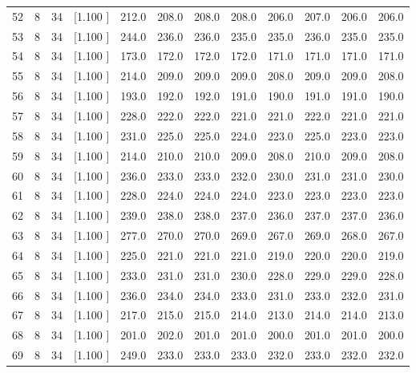 \documentclass[12pt,a4paper]{article}
\begin{document}
\begin{center}
{\begin{tabular}{r r r r r r r r r r r r}
  52&  8& 34&[1.100     ]&   212.0&   208.0&   208.0&   208.0&   206.0&   207.0&   206.0&   206.0\\[-0.02in]
  53&  8& 34&[1.100     ]&   244.0&   236.0&   236.0&   235.0&   235.0&   236.0&   235.0&   235.0\\[-0.02in]
  54&  8& 34&[1.100     ]&   173.0&   172.0&   172.0&   172.0&   171.0&   171.0&   171.0&   171.0\\[-0.02in]
  55&  8& 34&[1.100     ]&   214.0&   209.0&   209.0&   209.0&   208.0&   209.0&   209.0&   208.0\\[-0.02in]
  56&  8& 34&[1.100     ]&   193.0&   192.0&   192.0&   191.0&   190.0&   191.0&   191.0&   190.0\\[-0.02in]
  57&  8& 34&[1.100     ]&   228.0&   222.0&   222.0&   221.0&   221.0&   222.0&   221.0&   221.0\\[-0.02in]
  58&  8& 34&[1.100     ]&   231.0&   225.0&   225.0&   224.0&   223.0&   225.0&   223.0&   223.0\\[-0.02in]
  59&  8& 34&[1.100     ]&   214.0&   210.0&   210.0&   209.0&   208.0&   210.0&   209.0&   208.0\\[-0.02in]
  60&  8& 34&[1.100     ]&   236.0&   233.0&   233.0&   232.0&   230.0&   231.0&   231.0&   230.0\\[-0.02in]
  61&  8& 34&[1.100     ]&   228.0&   224.0&   224.0&   224.0&   223.0&   223.0&   223.0&   223.0\\[-0.02in]
  62&  8& 34&[1.100     ]&   239.0&   238.0&   238.0&   237.0&   236.0&   237.0&   237.0&   236.0\\[-0.02in]
  63&  8& 34&[1.100     ]&   277.0&   270.0&   270.0&   269.0&   267.0&   269.0&   268.0&   267.0\\[-0.02in]
  64&  8& 34&[1.100     ]&   225.0&   221.0&   221.0&   221.0&   219.0&   220.0&   220.0&   219.0\\[-0.02in]
  65&  8& 34&[1.100     ]&   233.0&   231.0&   231.0&   230.0&   228.0&   229.0&   229.0&   228.0\\[-0.02in]
  66&  8& 34&[1.100     ]&   236.0&   234.0&   234.0&   233.0&   231.0&   233.0&   232.0&   231.0\\[-0.02in]
  67&  8& 34&[1.100     ]&   217.0&   215.0&   215.0&   214.0&   213.0&   214.0&   214.0&   213.0\\[-0.02in]
  68&  8& 34&[1.100     ]&   201.0&   202.0&   201.0&   201.0&   200.0&   201.0&   201.0&   200.0\\[-0.02in]
  69&  8& 34&[1.100     ]&   249.0&   233.0&   233.0&   233.0&   232.0&   233.0&   232.0&   232.0\\[-0.02in]

\end{tabular}}
\end{center}
\end{document}
